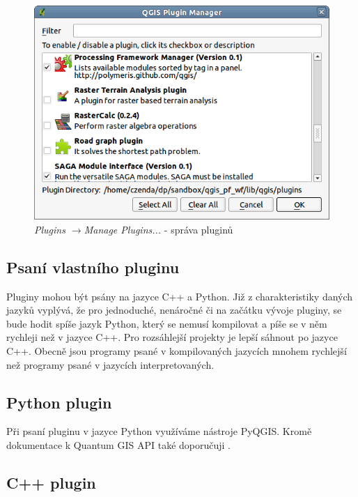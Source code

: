 \begin{figure}
	\centering
	\includegraphics[scale=0.5]{pictures/qgis_plugin/plugin_manager}
	\caption{\textit{Plugins $\rightarrow$Manage Plugins...} - správa pluginů}
  	\label{plugin_manager}
\end{figure}

\subsection{Psaní vlastního pluginu}
Pluginy mohou být psány na jazyce C++ a Python. Již z charakteristiky daných jazyků vyplývá, že pro jednoduché, nenáročné či na začátku vývoje pluginy, se bude hodit spíše jazyk Python, který se nemusí kompilovat a píše se v něm rychleji než v jazyce C++. Pro rozsáhlejší projekty je lepší sáhnout po jazyce C++. Obecně jsou programy psané v kompilovaných jazycích mnohem rychlejší než programy psané v jazycích interpretovaných. 

\subsection{Python plugin}
\nocite{pyqgis:www}
Při psaní pluginu v jazyce Python využíváme nástroje PyQGIS. Kromě dokumentace k Quantum GIS API také doporučuji \cite{pyqgis:www}. 




\subsection{C++ plugin}

